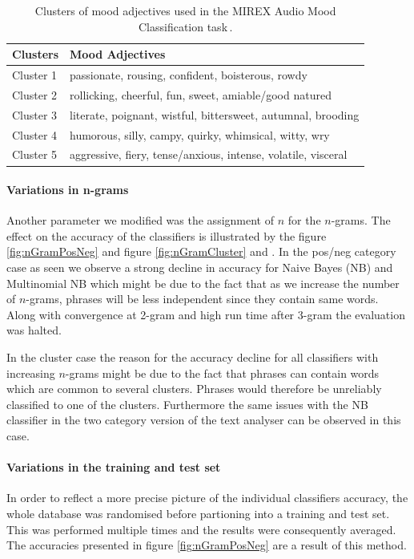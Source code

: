 \documentclass[a4paper,12pt]{article}
\begin{document}
\begin{table}
\begin{center}
\begin{tabular}{| l | l |}
\hline
\textbf{Clusters} & \textbf{Mood Adjectives} \\ \hline \hline 
Cluster 1 & passionate, rousing, confident, boisterous, rowdy \\ \hline
Cluster 2 & rollicking, cheerful, fun, sweet, amiable/good natured \\ \hline
Cluster 3 & literate, poignant, wistful, bittersweet, autumnal, brooding \\ \hline
Cluster 4 & humorous, silly, campy, quirky, whimsical, witty, wry \\ \hline
Cluster 5 & aggressive, fiery, tense/anxious, intense, volatile, visceral \\ \hline
\end{tabular}
\caption{Clusters of mood adjectives used in the MIREX Audio Mood Classification task\,\cite{downie20082007}.}
\label{tab:moodClusters}
\end{center}
\end{table}

\paragraph{Variations in n-grams} Another parameter we modified was the assignment of $n$ for the $n$-grams. The effect on the accuracy of the classifiers is illustrated by the figure \ref{fig:nGramPosNeg} and figure \ref{fig:nGramCluster} and . In the pos/neg category case as seen we observe a strong decline in accuracy for Naive Bayes (NB) and Multinomial NB which might be due to the fact that as we increase the number of $n$-grams, phrases will be less independent since they contain same words. Along with convergence at 2-gram and high run time after 3-gram the evaluation was halted.

In the cluster case the reason for the accuracy decline for all classifiers with increasing $n$-grams might be due to the fact that phrases can contain words which are common to several clusters. Phrases would therefore be unreliably classified to one of the clusters. Furthermore the same issues with the NB classifier in the two category version of the text analyser can be observed in this case.

\paragraph{Variations in the training and test set} 
In order to reflect a more precise picture of the individual classifiers accuracy, the whole database was randomised before partioning into a training and test set. This was performed multiple times and the results were consequently averaged. The accuracies presented in figure \ref{fig:nGramPosNeg} are a result of this method.
\end{document}
